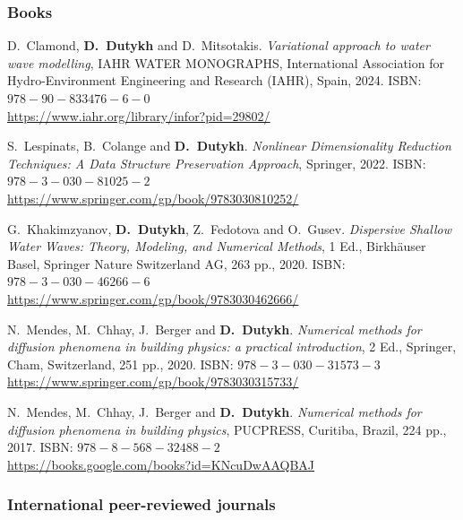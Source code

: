\documentclass[final, a4paper, oneside, 12pt]{article}
\numberwithin{equation}{section}
\begin{document}
\subsubsection{Books}

\begin{etaremune}

  \item D.~Clamond, \textbf{D.~Dutykh} and D.~Mitsotakis. \textit{Variational approach to water wave modelling}, IAHR WATER MONOGRAPHS, International Association for Hydro-Environment Engineering and Research (IAHR), Spain, 2024. ISBN: $978-90-833476-6-0$ \\
  \url{https://www.iahr.org/library/infor?pid=29802/}

  \item S.~Lespinats, B.~Colange and \textbf{D.~Dutykh}. \textit{Nonlinear Dimensionality Reduction Techniques: A Data Structure Preservation Approach}, Springer, 2022. ISBN: $978-3-030-81025-2$ \\
  \url{https://www.springer.com/gp/book/9783030810252/}

  \item G.~Khakimzyanov, \textbf{D.~Dutykh}, Z.~Fedotova and O.~Gusev. \textit{Dispersive Shallow Water Waves: Theory, Modeling, and Numerical Methods}, 1 Ed., Birkh\"auser Basel, Springer Nature Switzerland AG, 263 pp., 2020. ISBN: $978-3-030-46266-6$ \\
  \url{https://www.springer.com/gp/book/9783030462666/}

  \item N.~Mendes, M.~Chhay, J.~Berger and \textbf{D.~Dutykh}. \textit{Numerical methods for diffusion phenomena in building physics: a practical introduction}, 2 Ed., Springer, Cham, Switzerland, 251 pp., 2020. ISBN: $978-3-030-31573-3$ \\
  \url{https://www.springer.com/gp/book/9783030315733/}

  \item N.~Mendes, M.~Chhay, J.~Berger and \textbf{D.~Dutykh}. \textit{Numerical methods for diffusion phenomena in building physics}, PUCPRESS, Curitiba, Brazil, 224 pp., 2017. ISBN: $978-8-568-32488-2$ \\
  \url{https://books.google.com/books?id=KNcuDwAAQBAJ}
  
\end{etaremune}

\subsubsection{International peer-reviewed journals}
\end{document}
